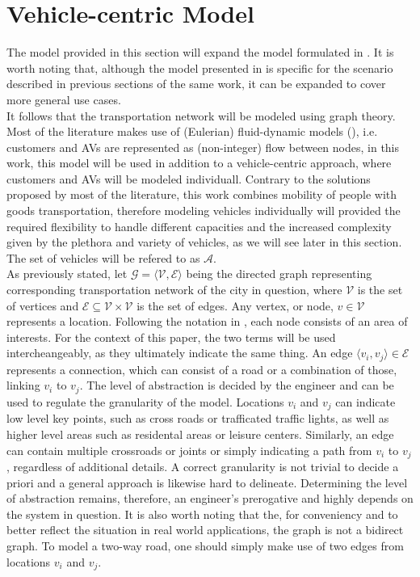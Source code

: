 \section{Vehicle-centric Model}\label{sec:vc_model}
The model provided in this section will expand the model formulated in \cite{project_thesis}. It is worth noting that, although the model presented in \cite{project_thesis} is specific for the scenario described in previous sections of the same work, it can be expanded to cover more general use cases. \\
It follows that the transportation network will be modeled using graph theory. Most of the literature makes use of (Eulerian) fluid-dynamic models (\cite{amod_review}), i.e. customers and AVs are represented as (non-integer) flow between nodes, in this work,
this model will be used in addition to a vehicle-centric approach, where customers and AVs will be modeled individuall. Contrary to the solutions proposed by most of the literature, this work combines mobility of people with goods transportation, therefore modeling vehicles individually will provided the required flexibility to handle different capacities and the increased complexity given by the plethora and variety of vehicles, as we will see later in this section. The set of vehicles will be refered to as $\mathcal{A}$. \\ 
As previously stated, let $\mathcal{G} = \langle \mathcal{V}, \mathcal{E} \rangle$ being the directed graph representing corresponding transportation network of the  city in question, where $\mathcal{V}$ is the set of vertices and $\mathcal{E} \subseteq \mathcal{V} \times \mathcal{V}$ is the set of edges. Any vertex, or node,  $ v \in  \mathcal{V}$ represents a location. Following the notation in \cite{project_thesis}, each node consists of an area of interests. For the context of this paper, the two terms will be used intercheangeably, as they ultimately indicate the same thing. An edge $\langle v_i, v_j \rangle \in \mathcal{E}$ represents a connection, which can consist of a road or a combination of those, linking $v_i$ to $v_j$. The level of abstraction is decided by the engineer and can be used to regulate the granularity of the model. Locations $v_i$ and $v_j$ can indicate low level key points, such as cross roads or trafficated traffic lights, as well as higher level areas such as residental areas or leisure centers. Similarly, an edge can contain multiple crossroads or joints or simply indicating a path from $v_i$ to $v_j$, regardless of additional details. A correct granularity is not trivial to decide a priori and a general approach is likewise hard to delineate.  Determining the level of abstraction remains, therefore, an engineer's prerogative and highly depends on the system in question. It is also worth noting that the, for conveniency and to better reflect the situation in real world applications, the graph is not a bidirect graph. To model a two-way road, one should simply make use of two edges from locations $v_i$ and $v_j$. \\
